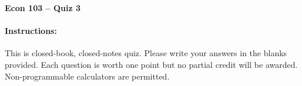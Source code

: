 \documentclass[addpoints,10pt]{exam}
\begin{document}
\thispagestyle{empty}

\noindent \textbf{Econ 103 -- Quiz 3}

\vspace{15pt}
\noindent
{}\hfill 
\paragraph{Instructions: } This is closed-book, closed-notes quiz. Please write your answers in the blanks provided. Each question is worth one point but no partial credit will be awarded. Non-programmable calculators are permitted.

\vspace{5pt}

\setlength\answerlinelength{2in}
\end{document}

